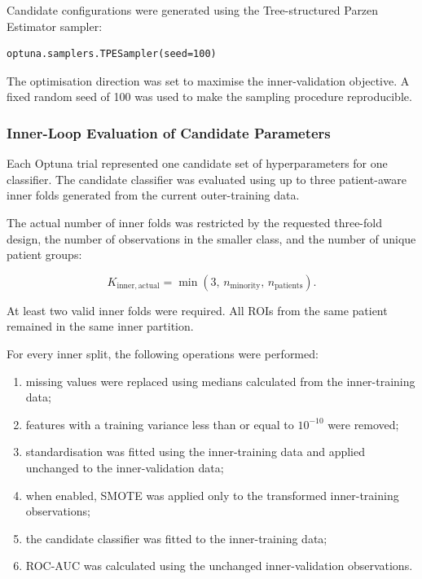 \documentclass[12pt,twocolumn]{article}
\begin{document}
Candidate configurations were generated using the Tree-structured
Parzen Estimator sampler:

\begin{verbatim}
optuna.samplers.TPESampler(seed=100)
\end{verbatim}

The optimisation direction was set to maximise the inner-validation
objective. A fixed random seed of 100 was used to make the sampling
procedure reproducible.







\subsubsection{Inner-Loop Evaluation of Candidate Parameters}
\label{subsubsec:optuna_inner_evaluation}

Each Optuna trial represented one candidate set of hyperparameters for
one classifier. The candidate classifier was evaluated using up to
three patient-aware inner folds generated from the current
outer-training data.

The actual number of inner folds was restricted by the requested
three-fold design, the number of observations in the smaller class,
and the number of unique patient groups:

\begin{equation}
K_{\mathrm{inner,actual}}
=
\min
\left(
3,\,
n_{\mathrm{minority}},\,
n_{\mathrm{patients}}
\right).
\label{eq:actual_inner_folds}
\end{equation}

At least two valid inner folds were required. All ROIs from the same
patient remained in the same inner partition.

For every inner split, the following operations were performed:

\begin{enumerate}
    \item missing values were replaced using medians calculated from
    the inner-training data;

    \item features with a training variance less than or equal to
    \(10^{-10}\) were removed;

    \item standardisation was fitted using the inner-training data and
    applied unchanged to the inner-validation data;

    \item when enabled, SMOTE was applied only to the transformed
    inner-training observations;

    \item the candidate classifier was fitted to the inner-training
    data;

    \item ROC-AUC was calculated using the unchanged inner-validation
    observations.
\end{enumerate}
\end{document}
